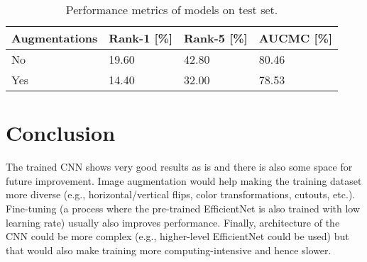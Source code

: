 \documentclass[9pt]{IEEEtran}
\begin{document}
\begin{table}[ht]
    \caption{Performance metrics of models on test set.}
    \label{tab:metrics}
    \centering
    \begin{tabular}{llll}
        Augmentations & Rank-1 [\%] & Rank-5 [\%] & AUCMC [\%] \\
        \hline
        No & 19.60 & 42.80 & 80.46 \\
        Yes & 14.40 & 32.00 & 78.53
    \end{tabular}
\end{table}

\section{Conclusion}
The trained CNN shows very good results as is and there is also some space for future improvement.
Image augmentation would help making the training dataset more diverse (e.g., horizontal/vertical flips, color transformations, cutouts, etc.).
Fine-tuning (a process where the pre-trained EfficientNet is also trained with low learning rate) usually also improves performance.
Finally, architecture of the CNN could be more complex (e.g., higher-level EfficientNet could be used) but that would also make training more computing-intensive and hence slower.



\end{document}
